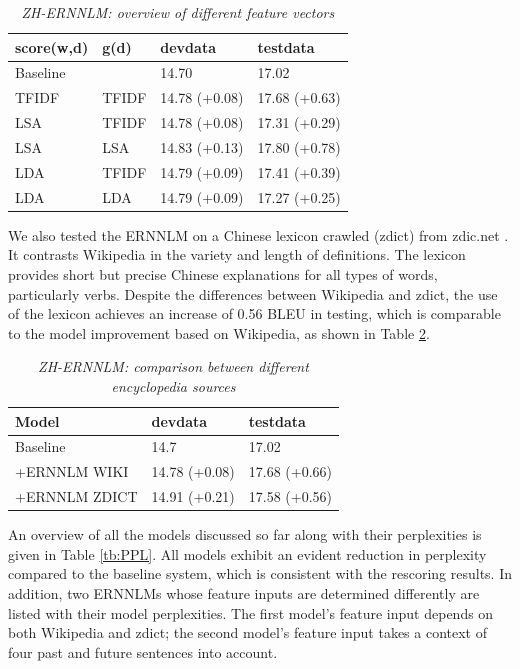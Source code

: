 \documentclass[a4paper]{article}
\begin{document}
\begin{table}
\caption{\it ZH-ERNNLM: overview of different feature vectors}
\vspace{2mm}
\centering
  \begin{tabular}{llll}
  	\hline
  	score(w,d) & g(d)  & devdata       & testdata      \\ \hline\hline
  	Baseline   &       & 14.70         & 17.02         \\ \hline
  	TFIDF      & TFIDF & 14.78 (+0.08) & 17.68 (+0.63) \\
  	LSA        & TFIDF & 14.78 (+0.08) & 17.31 (+0.29) \\
  	LSA        & LSA   & 14.83 (+0.13) & 17.80 (+0.78) \\
  	LDA        & TFIDF & 14.79 (+0.09) & 17.41 (+0.39) \\
  	LDA        & LDA   & 14.79 (+0.09) & 17.27 (+0.25)
  \end{tabular}
  \label{tb:zh-extended-diff-features}
\end{table}

We also tested the ERNNLM on a Chinese lexicon crawled (zdict) from zdic.net \cite{zdic}. It contrasts Wikipedia in the variety and length of definitions. The lexicon provides short but precise Chinese explanations for all types of words, particularly verbs. Despite the differences between Wikipedia and zdict, the use of the lexicon achieves an increase of 0.56 BLEU in testing, which is comparable to the model improvement based on Wikipedia, as shown in Table \ref{tb:zh-extended-diff-sources}.

\begin{table}
\caption{\it ZH-ERNNLM: comparison between different encyclopedia sources}
\vspace{2mm}
\centering
  \begin{tabular}{lll}
  	\hline
  	Model         & devdata       & testdata      \\ \hline\hline
  	Baseline      & 14.7          & 17.02         \\ \hline
  	+ERNNLM WIKI  & 14.78 (+0.08) & 17.68 (+0.66) \\
  	+ERNNLM ZDICT & 14.91 (+0.21) & 17.58 (+0.56) \\ \hline
  \end{tabular}
  \label{tb:zh-extended-diff-sources}
\end{table}

An overview of all the models discussed so far along with their perplexities is given in Table \ref{tb:PPL}. All models exhibit an evident reduction in perplexity compared to the baseline system, which is consistent with the rescoring results. In addition, two ERNNLMs whose feature inputs are determined differently are listed with their model perplexities. The first model's feature input depends on both Wikipedia and zdict; the second model's feature input takes a context of four past and future sentences into account.
\end{document}
